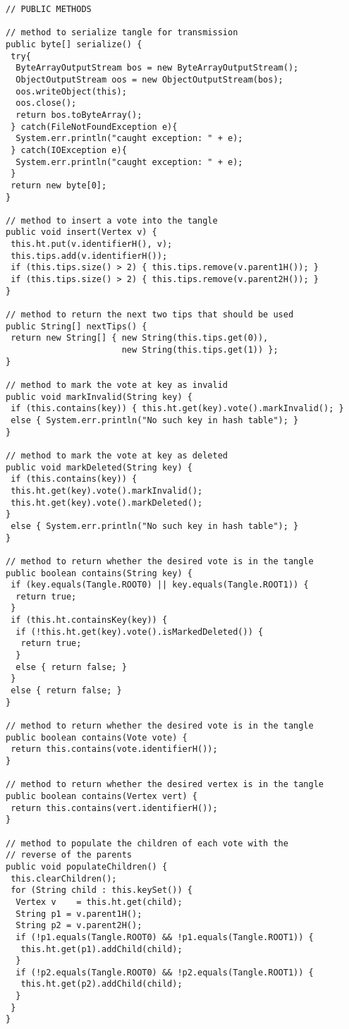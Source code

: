 \begin{Verbatim}
// PUBLIC METHODS

// method to serialize tangle for transmission
public byte[] serialize() {
 try{
  ByteArrayOutputStream bos = new ByteArrayOutputStream();
  ObjectOutputStream oos = new ObjectOutputStream(bos);
  oos.writeObject(this);
  oos.close();
  return bos.toByteArray();
 } catch(FileNotFoundException e){
  System.err.println("caught exception: " + e);
 } catch(IOException e){
  System.err.println("caught exception: " + e);
 }
 return new byte[0];
}

// method to insert a vote into the tangle
public void insert(Vertex v) {
 this.ht.put(v.identifierH(), v);
 this.tips.add(v.identifierH());
 if (this.tips.size() > 2) { this.tips.remove(v.parent1H()); }
 if (this.tips.size() > 2) { this.tips.remove(v.parent2H()); }
}

// method to return the next two tips that should be used
public String[] nextTips() {
 return new String[] { new String(this.tips.get(0)), 
                       new String(this.tips.get(1)) };
}

// method to mark the vote at key as invalid
public void markInvalid(String key) {
 if (this.contains(key)) { this.ht.get(key).vote().markInvalid(); }
 else { System.err.println("No such key in hash table"); }
}

// method to mark the vote at key as deleted
public void markDeleted(String key) {
 if (this.contains(key)) {
 this.ht.get(key).vote().markInvalid();
 this.ht.get(key).vote().markDeleted();
}
 else { System.err.println("No such key in hash table"); }
}

// method to return whether the desired vote is in the tangle
public boolean contains(String key) {
 if (key.equals(Tangle.ROOT0) || key.equals(Tangle.ROOT1)) { 
  return true; 
 }
 if (this.ht.containsKey(key)) {
  if (!this.ht.get(key).vote().isMarkedDeleted()) {
   return true;
  }
  else { return false; }
 }
 else { return false; }
}

// method to return whether the desired vote is in the tangle
public boolean contains(Vote vote) {
 return this.contains(vote.identifierH());
}

// method to return whether the desired vertex is in the tangle
public boolean contains(Vertex vert) {
 return this.contains(vert.identifierH());
}

// method to populate the children of each vote with the 
// reverse of the parents
public void populateChildren() {
 this.clearChildren();						
 for (String child : this.keySet()) {
  Vertex v    = this.ht.get(child);	
  String p1 = v.parent1H();			
  String p2 = v.parent2H();
  if (!p1.equals(Tangle.ROOT0) && !p1.equals(Tangle.ROOT1)) {	 
   this.ht.get(p1).addChild(child);					
  }
  if (!p2.equals(Tangle.ROOT0) && !p2.equals(Tangle.ROOT1)) {
   this.ht.get(p2).addChild(child);
  }
 }
}


\end{Verbatim}
